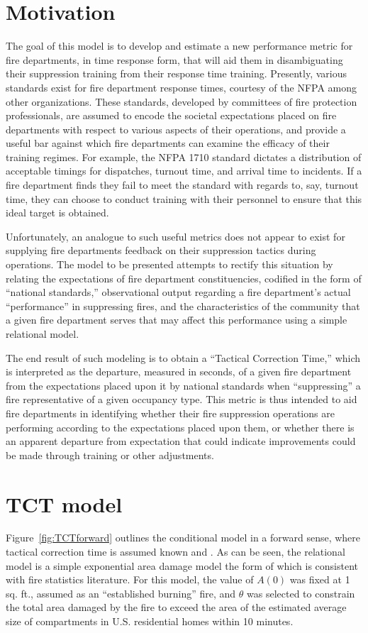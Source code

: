 \documentclass[12pt,oneside]{book}
\begin{document}
\section{Motivation}
The goal of this model is to develop and estimate a new performance metric for fire departments, in time response form, that will aid them in disambiguating their suppression training from their response time training. Presently, various standards exist for fire department response times, courtesy of the NFPA among other organizations. These standards, developed by committees of fire protection professionals, are assumed to encode the societal expectations placed on fire departments with respect to various aspects of their operations, and provide a useful bar against which fire departments can examine the efficacy of their training regimes. For example, the NFPA 1710 standard dictates a distribution of acceptable timings for dispatches, turnout time, and arrival time to incidents. If a fire department finds they fail to meet the standard with regards to, say, turnout time, they can choose to conduct training with their personnel to ensure that this ideal target is obtained.

Unfortunately, an analogue to such useful metrics does not appear to exist for supplying fire departments feedback on their suppression tactics during operations. The model to be presented attempts to rectify this situation by relating the expectations of fire department constituencies, codified in the form of ``national standards,'' observational output regarding a fire department's actual ``performance'' in suppressing fires, and the characteristics of the community that a given fire department serves that may affect this performance using a simple relational model.

The end result of such modeling is to obtain a ``Tactical Correction Time,'' which is interpreted as the departure, measured in seconds, of a given fire department from the expectations placed upon it by national standards when ``suppressing'' a fire representative of a given occupancy type. This metric is thus intended to aid fire departments in identifying whether their fire suppression operations are performing according to the expectations placed upon them, or whether there is an apparent departure from expectation that could indicate improvements could be made through training or other adjustments.

\section{TCT model}
Figure~\ref{fig:TCTforward} outlines the conditional model in a forward sense, where tactical correction time is assumed known and . As can be seen, the relational model is a simple exponential area damage model the form of which is consistent with fire statistics literature. For this model, the value of $A(0)$ was fixed at 1 sq. ft., assumed as an ``established burning'' fire, and $\theta$ was selected to constrain the total area damaged by the fire to exceed the area of the estimated average size of compartments in U.S. residential homes within 10 minutes.
\end{document}
